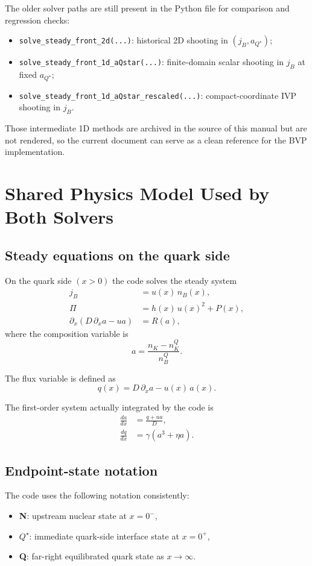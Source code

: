 \documentclass[11pt]{article}
\begin{document}
The older solver paths are still present in the Python file for comparison and
regression checks:
\begin{itemize}[leftmargin=1.5em]
\item \texttt{solve\_steady\_front\_2d(...)}: historical 2D shooting in
      $(j_B,a_{Q^\star})$;
\item \texttt{solve\_steady\_front\_1d\_aQstar(...)}: finite-domain scalar
      shooting in $j_B$ at fixed $a_{Q^\star}$;
\item \texttt{solve\_steady\_front\_1d\_aQstar\_rescaled(...)}:
      compact-coordinate IVP shooting in $j_B$.
\end{itemize}
Those intermediate 1D methods are archived in the source of this manual but are
not rendered, so the current document can serve as a clean reference for the BVP
implementation.

\section{Shared Physics Model Used by Both Solvers}
\subsection{Steady equations on the quark side}
On the quark side $(x > 0)$ the code solves the steady system
\begin{align}
j_B &= u(x)\, n_B(x), \\
\Pi &= h(x)\,u(x)^2 + P(x), \\
\partial_x \left(D\, \partial_x a - u a\right) &= R(a),
\end{align}
where the composition variable is
\begin{equation}
a = \frac{n_K - n_K^Q}{n_B^Q}.
\end{equation}

The flux variable is defined as
\begin{equation}
q(x) = D\, \partial_x a - u(x)\,a(x).
\end{equation}

The first-order system actually integrated by the code is
\begin{align}
\frac{da}{dx} &= \frac{q + u a}{D}, \\
\frac{dq}{dx} &= \gamma \left(a^3 + \eta a\right).
\end{align}

\subsection{Endpoint-state notation}
The code uses the following notation consistently:
\begin{itemize}[leftmargin=1.5em]
\item \textbf{N}: upstream nuclear state at $x=0^-$,
\item \textbf{$Q^\star$}: immediate quark-side interface state at $x=0^+$,
\item \textbf{Q}: far-right equilibrated quark state as $x \to \infty$.
\end{itemize}
\end{document}
